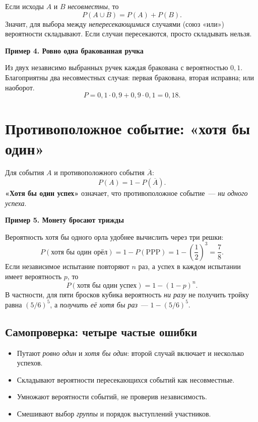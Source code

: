 \documentclass[a4paper,12pt]{article}
\newcommand{\keyidea}[1]{\textcolor{darkaccent}{\bfseries #1}}
\newcommand{\ex}[1]{\par\smallskip\textcolor{accent}{\bfseries #1}\par\smallskip}
\begin{document}
Если исходы $A$ и $B$ \emph{несовместны}, то
\[
P(A\cup B)=P(A)+P(B).
\]
Значит, для выбора между \emph{непересекающимися} случаями (союз «или») вероятности складывают. Если случаи пересекаются, просто складывать нельзя.

\ex{Пример 4. Ровно одна бракованная ручка}
Из двух независимо выбранных ручек каждая бракована с вероятностью $0{,}1$. Благоприятны два несовместных случая: первая бракована, вторая исправна; или наоборот.
\[
P=0{,}1\cdot0{,}9+0{,}9\cdot0{,}1=0{,}18.
\]

\section{Противоположное событие: «хотя бы один»}
Для события $A$ и противоположного события $\overline A$:
\[
\boxed{P(A)=1-P(\overline A).}
\]
\keyidea{«Хотя бы один успех»} означает, что противоположное событие~--- \emph{ни одного успеха}.

\ex{Пример 5. Монету бросают трижды}
Вероятность хотя бы одного орла удобнее вычислить через три решки:
\[
P(\text{хотя бы один орёл})
=1-P(\mathrm{PPP})=1-\left(\frac12\right)^3=\frac78.
\]
Если независимое испытание повторяют $n$ раз, а успех в каждом испытании имеет вероятность $p$, то
\[
\boxed{P(\text{хотя бы один успех})=1-(1-p)^n.}
\]
В частности, для пяти бросков кубика вероятность \emph{ни разу} не получить тройку равна $(5/6)^5$, а \emph{получить её хотя бы раз}~--- $1-(5/6)^5$.

\vspace{4mm}
\subsection*{Самопроверка: четыре частые ошибки}
\begin{itemize}
\item Путают \emph{ровно один} и \emph{хотя бы один}: второй случай включает и несколько успехов.
\item Складывают вероятности пересекающихся событий как несовместные.
\item Умножают вероятности событий, не проверив независимость.
\item Смешивают выбор \emph{группы} и порядок выступлений участников.
\end{itemize}
\end{document}
